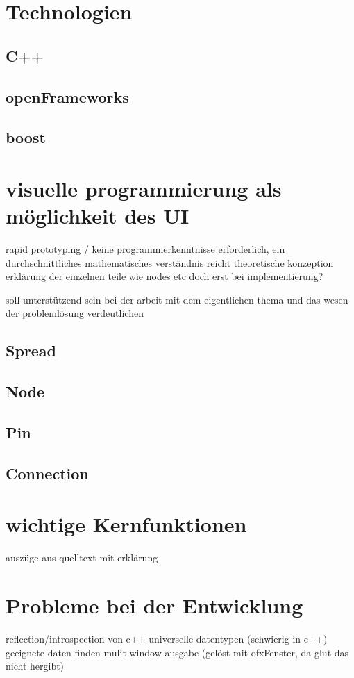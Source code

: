 \documentclass[a4paper, 12pt, onepage, pdftex, headsepline, footsepline]{scrreprt}
\begin{document}
\section{Technologien}
\subsection{C++}
\subsection{openFrameworks}
\subsection{boost}
\section{visuelle programmierung als möglichkeit des UI}
rapid prototyping / keine programmierkenntnisse erforderlich, ein durchschnittliches mathematisches verständnis reicht
theoretische konzeption
erklärung der einzelnen teile wie nodes etc doch erst bei implementierung?

soll unterstützend sein bei der arbeit mit dem eigentlichen thema und das wesen der problemlösung verdeutlichen
\subsection{Spread}
\subsection{Node}
\subsection{Pin}
\subsection{Connection}
\section{wichtige Kernfunktionen}
auszüge aus quelltext mit erklärung
\section{Probleme bei der Entwicklung}
reflection/introspection von c++
universelle datentypen (schwierig in c++)
geeignete daten finden
mulit-window ausgabe (gelöst mit ofxFenster, da glut das nicht hergibt)
\end{document}
